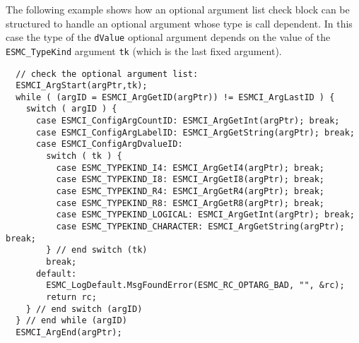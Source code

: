 \noindent
The following example shows how an optional argument list check block can be
structured to handle an optional argument whose type is call dependent. In this
case the type of the \texttt{dValue} optional argument depends on the value of the
\texttt{ESMC\_TypeKind} argument \texttt{tk} (which is the last fixed argument).
\begin{verbatim}
  // check the optional argument list:
  ESMCI_ArgStart(argPtr,tk);
  while ( (argID = ESMCI_ArgGetID(argPtr)) != ESMCI_ArgLastID ) {
    switch ( argID ) {
      case ESMCI_ConfigArgCountID: ESMCI_ArgGetInt(argPtr); break;
      case ESMCI_ConfigArgLabelID: ESMCI_ArgGetString(argPtr); break;
      case ESMCI_ConfigArgDvalueID:
        switch ( tk ) {
          case ESMC_TYPEKIND_I4: ESMCI_ArgGetI4(argPtr); break;
          case ESMC_TYPEKIND_I8: ESMCI_ArgGetI8(argPtr); break;
          case ESMC_TYPEKIND_R4: ESMCI_ArgGetR4(argPtr); break;
          case ESMC_TYPEKIND_R8: ESMCI_ArgGetR8(argPtr); break;
          case ESMC_TYPEKIND_LOGICAL: ESMCI_ArgGetInt(argPtr); break;
          case ESMC_TYPEKIND_CHARACTER: ESMCI_ArgGetString(argPtr); break;
        } // end switch (tk)
        break;
      default:
        ESMC_LogDefault.MsgFoundError(ESMC_RC_OPTARG_BAD, "", &rc);
        return rc;
    } // end switch (argID)
  } // end while (argID)
  ESMCI_ArgEnd(argPtr);
\end{verbatim}




